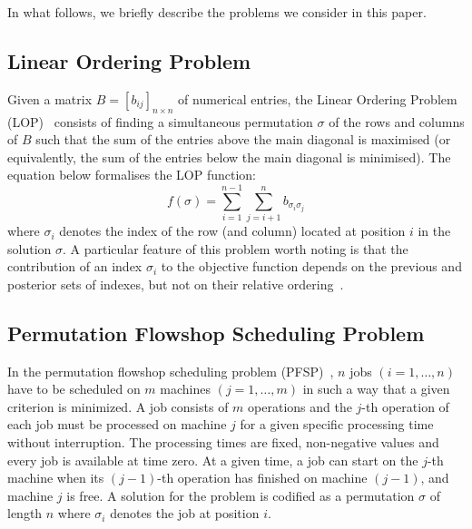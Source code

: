 \documentclass[conference]{IEEEtran}
\begin{document}
In what follows, we briefly describe the problems we consider in this paper. 

\subsection{Linear Ordering Problem}

Given a matrix $B = [b_{ij}]_{n \times n}$ of numerical entries, the Linear Ordering Problem (LOP)~\cite{marti2011linear,ceberio14a} consists of finding a simultaneous permutation $\sigma$ of the rows and columns of $B$ such that the sum of the entries above the main diagonal is maximised (or equivalently, the sum of the entries below the main diagonal is minimised). The equation below formalises the LOP function: \[f(\sigma)=\sum_{i=1}^{n-1} \sum_{j=i+1}^n b_{\sigma_i\sigma_j}\]where $\sigma_i$ denotes the index of the row (and column) located at position $i$ in the solution $\sigma$.  A particular feature of this problem worth noting is that the contribution of an index $\sigma_i$ to the objective function depends on the previous and posterior sets of indexes, but not on their relative ordering~\cite{ceberio14a}.
 
\subsection{Permutation Flowshop Scheduling Problem}

In the permutation flowshop scheduling problem (PFSP)~\cite{baker1974}, $n$ jobs $(i=1,\ldots,n)$ have to be scheduled on $m$ machines $(j=1,\ldots,m)$ in such a way that a given criterion is minimized.
A job consists of $m$ operations and the $j$-th operation of each job must be processed on machine $j$ for a given specific processing time without interruption. The processing times are fixed, non-negative values and every job is available at time zero. At a given time, a job can start on the $j$-th machine when its $(j-1)$-th operation has finished on machine $(j-1)$, and machine $j$ is free. A solution for the problem is codified as a permutation $\sigma$ of length $n$ where $\sigma_i$ denotes the job at position $i$.
\end{document}
